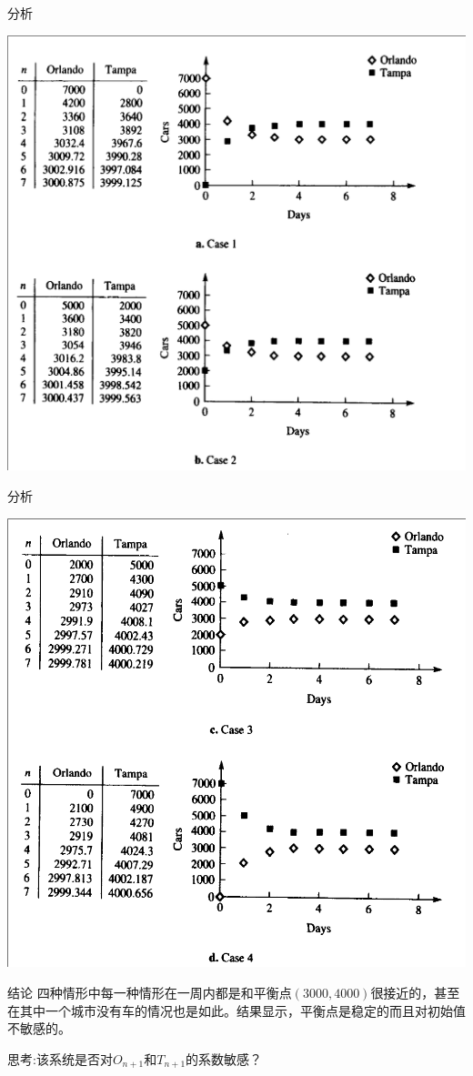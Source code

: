 \documentclass{beamer}
\begin{document}
\begin{frame}{分析}
  \begin{center}
    \includegraphics[width=.6\textwidth{}]{taxi-case12.png}
  \end{center}
\end{frame}

\begin{frame}{分析}
  \begin{center}
    \includegraphics[width=.6\textwidth{}]{taxi-case34.png}
  \end{center}
\end{frame}

\begin{frame}{结论}
  四种情形中每一种情形在一周内都是和平衡点$(3000,4000)$很接近的，甚至在其中一个城市没有车的情况也是如此。结果显示，平衡点是稳定的而且对初始值不敏感的。

  思考:该系统是否对$O_{n+1}$和$T_{n+1}$的系数敏感？

\end{frame}
\end{document}
